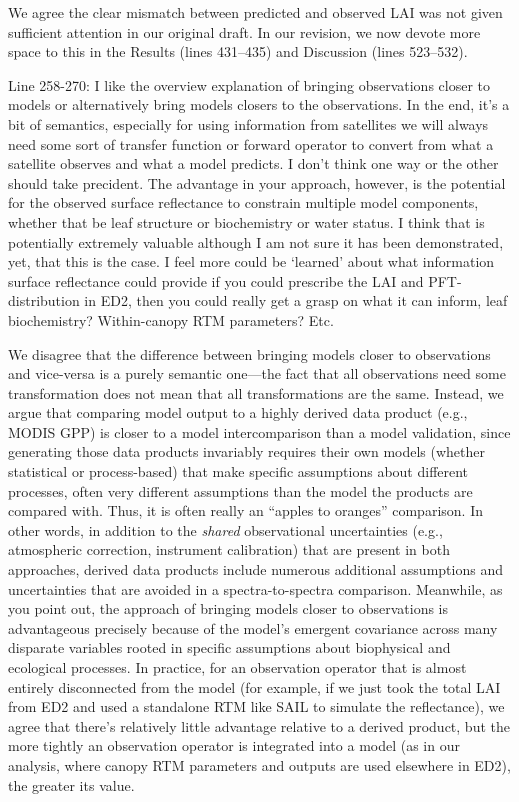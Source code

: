 We agree the clear mismatch between predicted and observed LAI was not given sufficient attention in our original draft.
In our revision, we now devote more space to this in the Results (lines 431--435) and Discussion (lines 523--532).

\begin{reviewer}
  Line 258-270: I like the overview explanation of bringing observations closer to models or alternatively bring models closers to the observations. In the end, it’s a bit of semantics, especially for using information from satellites we will always need some sort of transfer function or forward operator to convert from what a satellite observes and what a model predicts. I don’t think one way or the other should take precident. The advantage in your approach, however, is the potential for the observed surface reflectance to constrain multiple model components, whether that be leaf structure or biochemistry or water status. I think that is potentially extremely valuable although I am not sure it has been demonstrated, yet, that this is the case. I feel more could be ‘learned’ about what information surface reflectance could provide if you could prescribe the LAI and PFT-distribution in ED2, then you could really get a grasp on what it can inform, leaf biochemistry? Within-canopy RTM parameters? Etc.
\end{reviewer}

We disagree that the difference between bringing models closer to observations and vice-versa is a purely semantic one---the fact that all observations need some transformation does not mean that all transformations are the same.
Instead, we argue that comparing model output to a highly derived data product (e.g., MODIS GPP) is closer to a model intercomparison than a model validation, since generating those data products invariably requires their own models (whether statistical or process-based) that make specific assumptions about different processes, often very different assumptions than the model the products are compared with.
Thus, it is often really an ``apples to oranges'' comparison.
In other words, in addition to the \emph{shared} observational uncertainties (e.g., atmospheric correction, instrument calibration) that are present in both approaches, derived data products include numerous additional assumptions and uncertainties that are avoided in a spectra-to-spectra comparison.
Meanwhile, as you point out, the approach of bringing models closer to observations is advantageous precisely because of the model’s emergent covariance across many disparate variables rooted in specific assumptions about biophysical and ecological processes.
In practice, for an observation operator that is almost entirely disconnected from the model (for example, if we just took the total LAI from ED2 and used a standalone RTM like SAIL to simulate the reflectance), we agree that there’s relatively little advantage relative to a derived product,
but the more tightly an observation operator is integrated into a model (as in our analysis, where canopy RTM parameters and outputs are used elsewhere in ED2), the greater its value.

